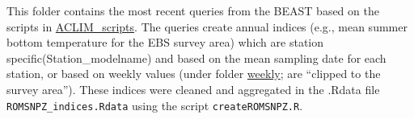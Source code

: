\documentclass[
]{article}
\begin{document}
This folder contains the most recent queries from the BEAST based on the
scripts in
\href{\%22https://github.com/kholsman/ACLIM/ACLIM_scripts\%22}{ACLIM\_scripts}.
The queries create annual indices (e.g., mean summer bottom temperature
for the EBS survey area) which are station specific(Station\_modelname)
and based on the mean sampling date for each station, or based on weekly
values (under folder
\href{\%22https://github.com/kholsman/ACLIM/ACLIM_data/ROMS_NPZ_queries/weekly\%22}{weekly};
are ``clipped to the survey area''). These indices were cleaned and
aggregated in the .Rdata file \texttt{ROMSNPZ\_indices.Rdata} using the
script \texttt{createROMSNPZ.R}.
\end{document}
